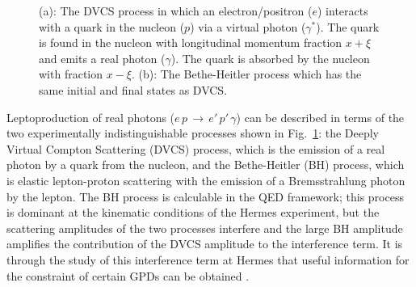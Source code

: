 \begin{figure}
\begin{center}
\hspace{3cm}
\caption[DVCS and Bethe Heitler hand bag diagram.]{(a): The DVCS process in
which an electron/positron ($e$) interacts with a quark in the nucleon ($p$) via a virtual photon ($\gamma^\ast$). The quark is found in the nucleon with longitudinal momentum fraction $x+\xi$ and emits a real photon ($\gamma$). The quark is absorbed by the nucleon with fraction $x-\xi$. (b): The Bethe-Heitler process which has the same initial and final states as DVCS.}
\label{spin}
\end{center}
\end{figure}

Leptoproduction of real photons ($e\,p\,\rightarrow\,e'\,p'\,\gamma$) can be described in terms of the two experimentally indistinguishable processes shown in Fig.~\ref{spin}: the Deeply Virtual Compton Scattering (DVCS) process, which is the
emission of a real photon by a quark from the nucleon, and the Bethe-Heitler (BH) process, which is elastic lepton-proton scattering with the
emission of a Bremsstrahlung photon by the lepton. 
The BH process is calculable in the QED framework; this process is
dominant at the kinematic conditions of the H{\sc ermes} experiment, but the
scattering amplitudes of the two processes interfere and the large BH amplitude
amplifies the contribution of the DVCS amplitude to the interference term. 
It is through the study of this interference term at H{\sc ermes} that
useful information for the constraint of certain GPDs can be obtained \cite{Bel02b}.

